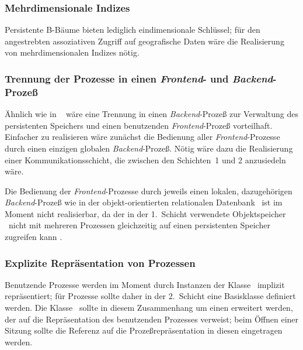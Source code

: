 \subsubsection{Mehrdimensionale Indizes}
%
Persistente B-B\"{a}ume bieten lediglich eindimensionale Schl\"{u}ssel; f\"{u}r
den angestrebten assoziativen Zugriff auf geografische Daten w\"{a}re die
Realisierung von mehrdimensionalen Indizes n\"{o}tig.
%
\subsubsection{Trennung der Prozesse in einen {\em
Frontend\/}- und {\em Backend\/}-Proze\ss{}}
%
\"{A}hnlich wie in \postgres\ \cite[]{bib:we93} w\"{a}re eine
Trennung in einen {\em Backend\/}-Proze\ss{} zur Verwaltung des
persistenten Speichers und einen benutzenden {\em Frontend\/}-Proze\ss{}
vorteilhaft. Einfacher zu realisieren w\"{a}re zun\"{a}chst die Bedienung
aller {\em Frontend\/}-Prozesse durch einen einzigen globalen {\em
Backend\/}-Proze\ss{}. N\"{o}tig w\"{a}re dazu die Realisierung einer
Kommunikationsschicht, die zwischen den Schichten~1 und 2 anzusiedeln
w\"{a}re.
%
\par{}Die Bedienung der {\em Frontend\/}-Prozesse durch jeweils einen 
lokalen, dazugeh\"{o}rigen {\em Backend\/}-Proze\ss{} wie in der
objekt-orientierten relationalen Datenbank \postgres\ ist im Moment
nicht realisierbar, da der in der 1.~Schicht verwendete Objektspeicher
\postore\ nicht mit mehreren Prozessen gleichzeitig auf einen
persistenten Speicher zugreifen kann \cite[]{bib:br92}.
%
\subsubsection{Explizite Repr\"{a}sentation von Prozessen}
%
Benutzende Prozesse werden im Moment durch Instanzen der Klasse
\ implizit repr\"{a}sentiert; f\"{u}r Prozesse sollte
daher in der 2.~Schicht eine Basisklasse definiert werden. Die Klasse
\ sollte in diesem Zusammenhang um einen
\Slt\/ erweitert werden, der auf die Repr\"{a}sentation des benutzenden
Prozesses verweist; beim \"{O}ffnen einer Sitzung sollte die Referenz
auf die Proze\ss{}repr\"{a}sentation in diesen \Slt\/ eingetragen werden.
